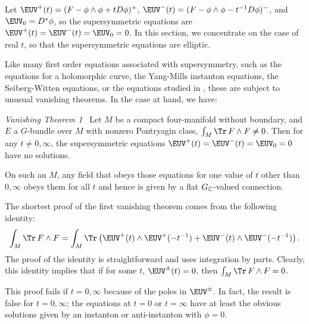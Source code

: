 Let $\EUV^+(t)= (F-\phi\wedge\phi+tD\phi)^+$, $\EUV^-(t)=
(F-\phi\wedge\phi-t^{-1}D\phi)^-$, and $\EUV_0= D^* \phi$, so the
supersymmetric equations are $\EUV^+(t)=\EUV^-(t)=\EUV_0=0$.  In
this section, we concentrate on the case of real $t$, so that the
supersymmetric equations are elliptic.

Like many first order equations associated with supersymmetry,
such as the equations for a holomorphic curve, the Yang-Mills
instanton equations, the Seiberg-Witten equations, or the
equations studied in \cite{ref45}, these are subject to unusual
vanishing theorems. In the case at hand, we have:

\par\medskip
 {\it Vanishing Theorem 1~}  Let $M$ be a compact
four-manifold  without boundary, and $E$ a $G$-bundle over $M$
with
 nonzero Pontryagin class, $\int_M
\Tr\,F\wedge F\not=0$.  Then for any $t\not=0,\infty$, the
supersymmetric equations $\EUV^+(t)=\EUV^-(t)=\EUV_0=0$ have no
solutions.

\par{} On such an $M$, any
field that obeys those equations
 for one value of $t$ other than $0,\infty$ obeys them for all $t$
 and hence is given by a flat $G_\Bbb{C}$-valued connection.

\par\medskip

The shortest proof of the first vanishing theorem comes from the
following identity: %
\setcounter{equation}{31}
\begin{equation}\label{eq:hombo}
\int_M\Tr\,F\wedge
F=\int_M\Tr\left(\EUV^+(t)\wedge \EUV^+(-t^{-1})+\EUV^-(t)\wedge
\EUV^-(-t^{-1})\right).
\end{equation}
 The proof of the identity is
straightforward and uses integration by parts. Clearly, this
identity implies that if for some $t$, $\EUV^\pm(t)=0$, then
$\int_M\Tr\, F\wedge F=0$.

This proof fails if $t=0,\infty$ because of the poles in
$\EUV^\pm$. In fact, the result is false for $t=0,\infty$; the
equations at $t=0$ or $t=\infty$ have at least the obvious
solutions given by an instanton or anti-instanton with $\phi=0$.

